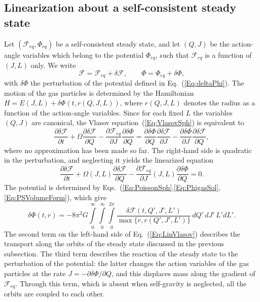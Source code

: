 \subsection{Linearization about a self-consistent steady state}
\label{SubSec:Linearization}

Let $(\mathcal{F}_{eq},\Phi_{eq})$ be a self-consistent steady state, and let $(Q,J)$ be the action-angle variables which belong to the potential $\Phi_{eq}$, such that $\mathcal{F}_{eq}$ is a function of $(J,L)$ only. We write
\begin{equation}
\mathcal{F} = \mathcal{F}_{eq} + \delta\mathcal{F},\qquad
\Phi = \Phi_{eq} + \delta\Phi,
\end{equation}
with $\delta\Phi$ the perturbation of the potential defined in Eq.~(\ref{Eq:deltaPhi}). The motion of the gas particles is determined by the Hamiltonian $H = E(J,L) + \delta\Phi(t,r(Q,J,L))$, where $r(Q,J,L)$ denotes the radius as a function of the action-angle variables. Since for each fixed $L$ the variables $(Q,J)$ are canonical, the Vlasov equation~(\ref{Eq:VlasovSph}) is equivalent to
\begin{equation}
\frac{\partial\delta\mathcal{F}}{\partial t} + \Omega\frac{\partial\delta\mathcal{F}}{\partial Q} - \frac{\partial\mathcal{F}_{eq}}{\partial J}\frac{\partial\delta\Phi}{\partial Q}
 = \frac{\partial\delta\Phi}{\partial Q}\frac{\partial\delta\mathcal{F}}{\partial J} - \frac{\partial\delta\Phi}{\partial J}\frac{\partial\delta\mathcal{F}}{\partial Q},
\label{Eq:VlasovPert}
\end{equation}
where no approximation has been made so far. The right-hand side is quadratic in the perturbation, and neglecting it yields the linearized equation
\begin{equation}
\frac{\partial\delta\mathcal{F}}{\partial t} + \Omega(J,L)\frac{\partial\delta\mathcal{F}}{\partial Q} - \frac{\partial\mathcal{F}_{eq}}{\partial J}(J,L)\frac{\partial\delta\Phi}{\partial Q} = 0.
\label{Eq:LinVlasov}
\end{equation}
The potential is determined by Eqs.~(\ref{Eq:PoissonSph},\ref{Eq:PhigasSol},\ref{Eq:PSVolumeForm}), which give
\begin{equation}
\delta\Phi(t,r) = -8\pi^2 G\int\limits_0^\infty\int\limits_0^\infty\int\limits_0^{2\pi} \frac{\delta\mathcal{F}(t,Q',J',L')}{\max\{ r,r(Q',J',L') \}}\, dQ'\, dJ'\, L' dL'.
\label{Eq:LinPoisson}
\end{equation}
The second term on the left-hand side of Eq.~(\ref{Eq:LinVlasov}) describes the transport along the orbits of the steady state discussed in the previous subsection. The third term describes the reaction of the steady state to the perturbation of the potential: the latter changes the action variables of the gas particles at the rate $\dot{J} = -\partial\delta\Phi/\partial Q$, and this displaces mass along the gradient of $\mathcal{F}_{eq}$. Through this term, which is absent when self-gravity is neglected, all the orbits are coupled to each other.

